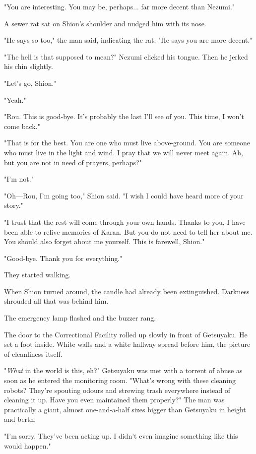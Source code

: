 "You are interesting. You may be, perhaps... far more decent than
Nezumi."

A sewer rat sat on Shion's shoulder and nudged him with its nose.

"He says so too," the man said, indicating the rat. "He says you are
more decent."

"The hell is that supposed to mean?" Nezumi clicked his tongue. Then he
jerked his chin slightly.

"Let's go, Shion."

"Yeah."

"Rou. This is good-bye. It's probably the last I'll see of you. This
time, I won't come back."

"That is for the best. You are one who must live above-ground. You are
someone who must live in the light and wind. I pray that we will never
meet again. Ah, but you are not in need of prayers, perhaps?"

"I'm not."

"Oh---Rou, I'm going too," Shion said. "I wish I could have heard more of
your story."

"I trust that the rest will come through your own hands. Thanks to you,
I have been able to relive memories of Karan. But you do not need to
tell her about me. You should also forget about me yourself. This is
farewell, Shion."

"Good-bye. Thank you for everything."

They started walking.

When Shion turned around, the candle had already been extinguished.
Darkness shrouded all that was behind him.

\mybreak

The emergency lamp flashed and the buzzer rang.

The door to the Correctional Facility rolled up slowly in front of
Getsuyaku. He set a foot inside. White walls and a white hallway spread
before him, the picture of cleanliness itself.

"\emph{What} in the world is this, eh?" Getsuyaku was met with a torrent of
abuse as soon as he entered the monitoring room. "What's wrong with
these cleaning robots? They're spouting odours and strewing trash
everywhere instead of cleaning it up. Have you even maintained them
properly?" The man was practically a giant, almost one-and-a-half sizes
bigger than Getsuyaku in height and berth.

"I'm sorry. They've been acting up. I didn't even imagine something like
this would happen."

